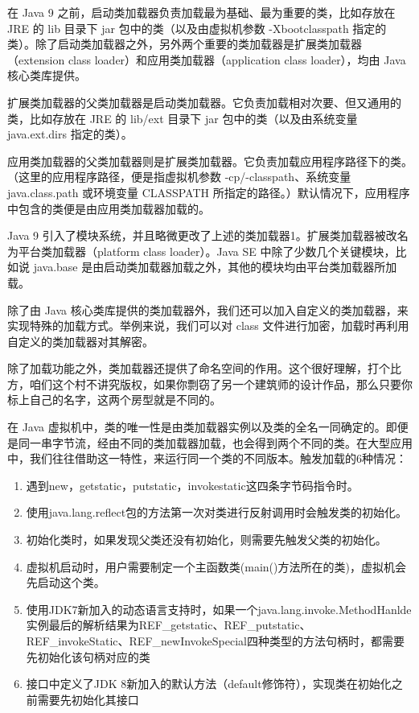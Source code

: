 \documentclass[../../../interview-questions.tex]{subfiles}
\begin{document}
在 Java 9 之前，启动类加载器负责加载最为基础、最为重要的类，比如存放在 JRE 的 lib 目录下 jar 包中的类（以及由虚拟机参数 -Xbootclasspath 指定的类）。除了启动类加载器之外，另外两个重要的类加载器是扩展类加载器（extension class loader）和应用类加载器（application class loader），均由 Java 核心类库提供。

扩展类加载器的父类加载器是启动类加载器。它负责加载相对次要、但又通用的类，比如存放在 JRE 的 lib/ext 目录下 jar 包中的类（以及由系统变量 java.ext.dirs 指定的类）。

应用类加载器的父类加载器则是扩展类加载器。它负责加载应用程序路径下的类。（这里的应用程序路径，便是指虚拟机参数 -cp/-classpath、系统变量 java.class.path 或环境变量 CLASSPATH 所指定的路径。）默认情况下，应用程序中包含的类便是由应用类加载器加载的。

Java 9 引入了模块系统，并且略微更改了上述的类加载器1。扩展类加载器被改名为平台类加载器（platform class loader）。Java SE 中除了少数几个关键模块，比如说 java.base 是由启动类加载器加载之外，其他的模块均由平台类加载器所加载。

除了由 Java 核心类库提供的类加载器外，我们还可以加入自定义的类加载器，来实现特殊的加载方式。举例来说，我们可以对 class 文件进行加密，加载时再利用自定义的类加载器对其解密。

除了加载功能之外，类加载器还提供了命名空间的作用。这个很好理解，打个比方，咱们这个村不讲究版权，如果你剽窃了另一个建筑师的设计作品，那么只要你标上自己的名字，这两个房型就是不同的。

在 Java 虚拟机中，类的唯一性是由类加载器实例以及类的全名一同确定的。即便是同一串字节流，经由不同的类加载器加载，也会得到两个不同的类。在大型应用中，我们往往借助这一特性，来运行同一个类的不同版本。触发加载的6种情况：

\begin{enumerate}
    \item {遇到new，getstatic，putstatic，invokestatic这四条字节码指令时。}
    \item {使用java.lang.reflect包的方法第一次对类进行反射调用时会触发类的初始化。}
    \item {初始化类时，如果发现父类还没有初始化，则需要先触发父类的初始化。}
    \item {虚拟机启动时，用户需要制定一个主函数类(main()方法所在的类)，虚拟机会先启动这个类。}
    \item {使用JDK7新加入的动态语言支持时，如果一个java.lang.invoke.MethodHanlde实例最后的解析结果为REF\_getstatic、REF\_putstatic、REF\_invokeStatic、REF\_newInvokeSpecial四种类型的方法句柄时，都需要先初始化该句柄对应的类}
    \item {接口中定义了JDK 8新加入的默认方法（default修饰符），实现类在初始化之前需要先初始化其接口}
\end{enumerate}
\end{document}
